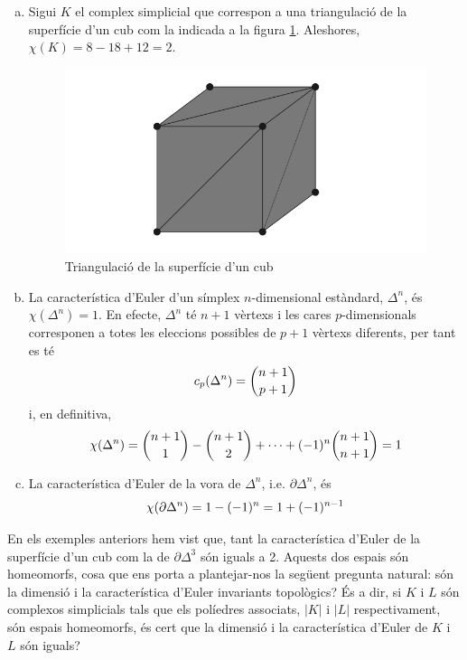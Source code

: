 \documentclass[../main.tex]{subfiles}
\begin{document}
\begin{ej}
\begin{enumerate}[(a)]
    \item Sigui $K$ el complex simplicial que correspon a una triangulació de la superfície d'un cub com la indicada a la figura \ref{fig:triangulaciodelasuperficieduncub}. Aleshores, $\chi(K) = 8-18+12=2$.
    \begin{figure}
        \centering
        \includegraphics[scale = 0.5]{pictures/cubtriangulat.png}
        \caption{Triangulació de la superfície d'un cub}
        \label{fig:triangulaciodelasuperficieduncub}
    \end{figure}
    \item La característica d'Euler d'un símplex $n$-dimensional estàndard, $\Delta^n$, és $\chi(\Delta^n) = 1$. En efecte, $\Delta^n$ té $n+1$ vèrtexs i les cares $p$-dimensionals corresponen a totes les eleccions possibles de $p+1$ vèrtexs diferents, per tant es té
    \begin{equation}
        \notag
        c_p(\Delta^n) = \binom{n+1}{p+1}
    \end{equation}
    i, en definitiva,
    \begin{equation}
        \notag
        \chi(\Delta^n) = \binom{n+1}{1}-\binom{n+1}{2}+\cdots+(-1)^n\binom{n+1}{n+1} = 1
    \end{equation}
    \item La característica d'Euler de la vora de $\Delta^n$, i.e. $\partial \Delta^n$, és
    \begin{equation}
        \notag
        \chi(\partial\Delta^n) = 1-(-1)^n = 1+(-1)^{n-1}
    \end{equation}
\end{enumerate}
\end{ej}

En els exemples anteriors hem vist que, tant la característica d'Euler de la superfície d'un cub com la de $\partial\Delta^3$ són iguals a 2. Aquests dos espais són homeomorfs, cosa que ens porta a plantejar-nos la següent pregunta natural: són la dimensió i la característica d'Euler invariants topològics? És a dir, si $K$ i $L$ són complexos simplicials tals que els políedres associats, $|K|$ i $|L|$ respectivament, són espais homeomorfs, és cert que la dimensió i la característica d'Euler de $K$ i $L$ són iguals?
\end{document}
